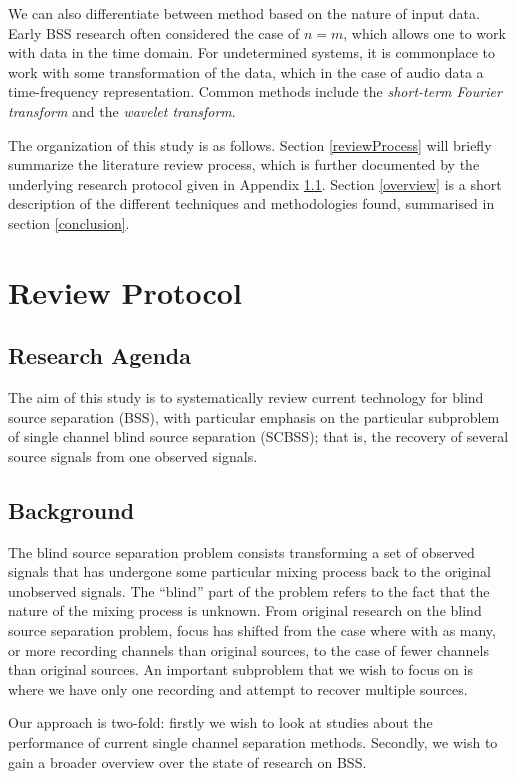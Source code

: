 \documentclass[11pt, oneside, a4paper]{report}
\begin{document}
We can also differentiate between method based on the nature of input
data. Early BSS research often considered the case of $n=m$, which
allows one to work with data in the time domain. For undetermined
systems, it is commonplace to work with some transformation of the
data, which in the case of audio data a time-frequency
representation. Common methods include the \emph{short-term Fourier
  transform} and the \emph{wavelet transform}.


The organization of this study is as follows. Section
\ref{reviewProcess} will briefly summarize the literature review
process, which is further documented by the underlying research
protocol given in Appendix \ref{protocol}. Section \ref{overview} is
a short description of the different techniques and methodologies found, summarised in section \ref{conclusion}.




\section{Review Protocol}

\subsection{Research Agenda}\label{protocol}
The aim of this study is to systematically review current technology
for blind source separation (BSS), with particular emphasis on the
particular subproblem of single channel blind source separation
(SCBSS); that is, the recovery of several source signals from one observed signals.


\subsection{Background}
The blind source separation problem consists transforming a set of observed signals that has undergone some particular mixing process back to the original unobserved signals. The “blind” part of the problem refers to the fact that the nature of the mixing process is unknown. From original research on the blind source separation problem, focus has shifted from the case where with as many, or more recording channels than original sources, to the case of fewer channels than original sources. An important subproblem that we wish to focus on is where we have only one recording and attempt to recover multiple sources.

Our approach is two-fold: firstly we wish to look at studies about the performance of current single channel separation methods. Secondly, we wish to gain a broader overview over the state of research on BSS.
\end{document}
